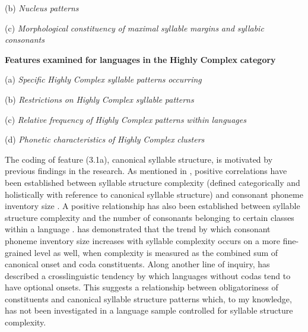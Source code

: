 (b)   \textit{Nucleus} \textit{patterns}

(c)   \textit{Morphological} \textit{constituency} \textit{of} \textit{maximal} \textit{syllable} \textit{margins} \textit{and} \textit{syllabic} \textit{consonants}
\z

\ea\label{ex:(3.2)}
   \textbf{Features} \textbf{examined} \textbf{for} \textbf{languages} \textbf{in} \textbf{the} \textbf{Highly} \textbf{Complex} \textbf{category}

(a)   \textit{Specific} \textit{Highly} \textit{Complex} \textit{syllable} \textit{patterns} \textit{occurring}

(b)   \textit{Restrictions} \textit{on} \textit{Highly} \textit{Complex} \textit{syllable} \textit{patterns}

(c)   \textit{Relative} \textit{frequency} \textit{of} \textit{Highly} \textit{Complex} \textit{patterns} \textit{within} \textit{languages}

(d)   \textit{Phonetic} \textit{characteristics} \textit{of} \textit{Highly} \textit{Complex} \textit{clusters}

\z

  The coding of feature (3.1a), canonical syllable structure, is motivated by previous findings in the research. As mentioned in , positive correlations have been established between syllable structure complexity (defined categorically and holistically with reference to canonical syllable structure) and consonant phoneme inventory size \citep{Maddieson2013a}. A positive relationship has also been established between syllable structure complexity and the number of consonants belonging to certain classes within a language \citep{MaddiesonEtAl2013}. \citet{Gordon2016} has demonstrated that the trend by which consonant phoneme inventory size increases with syllable complexity occurs on a more fine-grained level as well, when complexity is measured as the combined sum of canonical onset and coda constituents. Along another line of inquiry, \citet[336]{Blevins2006} has described a crosslinguistic tendency by which languages without codas tend to have optional onsets. This suggests a relationship between obligatoriness of constituents and canonical syllable structure patterns which, to my knowledge, has not been investigated in a language sample controlled for syllable structure complexity.

